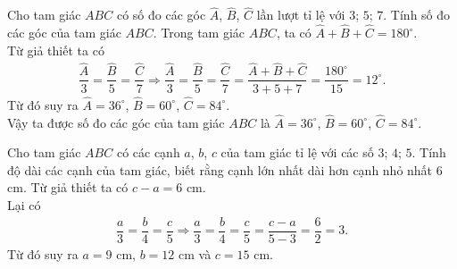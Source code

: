\begin{vn}
 Cho tam giác $ABC$ có số đo các góc $\widehat{A}$, $\widehat{B}$, $\widehat{C}$ lần lượt tỉ lệ với $3$; $5$; $7$. Tính số đo các góc của tam giác $ABC$.
 \loigiai
  {
  Trong tam giác $ABC$, ta có $\widehat{A}+\widehat{B}+\widehat{C}=180^\circ$.\\
  Từ giả thiết ta có
  \begin{eqnarray*}
   \dfrac{\widehat{A}}{3} = \dfrac{\widehat{B}}{5} = \dfrac{\widehat{C}}{7} \Rightarrow \dfrac{\widehat{A}}{3} = \dfrac{\widehat{B}}{5} = \dfrac{\widehat{C}}{7} = \dfrac{\widehat{A}+\widehat{B}+\widehat{C}}{3+5+7} = \dfrac{180^\circ}{15} = 12^\circ.
  \end{eqnarray*}
  Từ đó suy ra $\widehat{A}=36^\circ$, $\widehat{B}=60^\circ$, $\widehat{C}=84^\circ$.\\
  Vậy ta được số đo các góc của tam giác $ABC$ là $\widehat{A}=36^\circ$, $\widehat{B}=60^\circ$, $\widehat{C}=84^\circ$.
}
\end{vn}


\begin{vn}
 Cho tam giác $ABC$ có các cạnh $a$, $b$, $c$ của tam giác tỉ lệ với các số $3$; $4$; $5$. Tính độ dài các cạnh của tam giác, biết rằng cạnh lớn nhất dài hơn cạnh nhỏ nhất $6$ cm.
 \loigiai
  {
  Từ giả thiết ta có $c-a=6$ cm.\\
  Lại có
  \begin{eqnarray*}
   \dfrac{a}{3} = \dfrac{b}{4} = \dfrac{c}{5} \Rightarrow \dfrac{a}{3}=\dfrac{b}{4} = \dfrac{c}{5}=\dfrac{c-a}{5-3}= \dfrac{6}{2} = 3.
  \end{eqnarray*}
  Từ đó suy ra $a=9$ cm, $b=12$ cm và $c=15$ cm.
  }
\end{vn}


